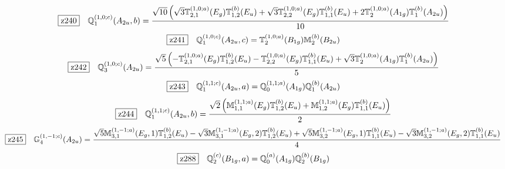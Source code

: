 \documentclass[fleqn,10pt,landscape]{jsarticle}
\begin{document}
\begin{dmath*}
\hspace*{3mm}\fbox{z240}\quad \mathbb{Q}_{1}^{(1,0;c)}(A_{2u},b)=\frac{\sqrt{10} \left(\sqrt{3} \mathbb{T}_{2,1}^{(1,0;a)}(E_{g}) \mathbb{T}_{1,2}^{(b)}(E_{u}) + \sqrt{3} \mathbb{T}_{2,2}^{(1,0;a)}(E_{g}) \mathbb{T}_{1,1}^{(b)}(E_{u}) + 2 \mathbb{T}_{2}^{(1,0;a)}(A_{1g}) \mathbb{T}_{1}^{(b)}(A_{2u})\right)}{10}
\end{dmath*}
\begin{dmath*}
\hspace*{3mm}\fbox{z241}\quad \mathbb{Q}_{1}^{(1,0;c)}(A_{2u},c)=\mathbb{T}_{2}^{(1,0;a)}(B_{1g}) \mathbb{M}_{2}^{(b)}(B_{2u})
\end{dmath*}
\begin{dmath*}
\hspace*{3mm}\fbox{z242}\quad \mathbb{Q}_{3}^{(1,0;c)}(A_{2u})=\frac{\sqrt{5} \left(- \mathbb{T}_{2,1}^{(1,0;a)}(E_{g}) \mathbb{T}_{1,2}^{(b)}(E_{u}) - \mathbb{T}_{2,2}^{(1,0;a)}(E_{g}) \mathbb{T}_{1,1}^{(b)}(E_{u}) + \sqrt{3} \mathbb{T}_{2}^{(1,0;a)}(A_{1g}) \mathbb{T}_{1}^{(b)}(A_{2u})\right)}{5}
\end{dmath*}
\begin{dmath*}
\hspace*{3mm}\fbox{z243}\quad \mathbb{Q}_{1}^{(1,1;c)}(A_{2u},a)=\mathbb{Q}_{0}^{(1,1;a)}(A_{1g}) \mathbb{Q}_{1}^{(b)}(A_{2u})
\end{dmath*}
\begin{dmath*}
\hspace*{3mm}\fbox{z244}\quad \mathbb{Q}_{1}^{(1,1;c)}(A_{2u},b)=\frac{\sqrt{2} \left(\mathbb{M}_{1,1}^{(1,1;a)}(E_{g}) \mathbb{T}_{1,2}^{(b)}(E_{u}) + \mathbb{M}_{1,2}^{(1,1;a)}(E_{g}) \mathbb{T}_{1,1}^{(b)}(E_{u})\right)}{2}
\end{dmath*}
\begin{dmath*}
\hspace*{3mm}\fbox{z245}\quad \mathbb{G}_{4}^{(1,-1;c)}(A_{2u})=\frac{\sqrt{5} \mathbb{M}_{3,1}^{(1,-1;a)}(E_{g},1) \mathbb{T}_{1,2}^{(b)}(E_{u}) - \sqrt{3} \mathbb{M}_{3,1}^{(1,-1;a)}(E_{g},2) \mathbb{T}_{1,2}^{(b)}(E_{u}) + \sqrt{5} \mathbb{M}_{3,2}^{(1,-1;a)}(E_{g},1) \mathbb{T}_{1,1}^{(b)}(E_{u}) - \sqrt{3} \mathbb{M}_{3,2}^{(1,-1;a)}(E_{g},2) \mathbb{T}_{1,1}^{(b)}(E_{u})}{4}
\end{dmath*}
\begin{dmath*}
\hspace*{3mm}\fbox{z288}\quad \mathbb{Q}_{2}^{(c)}(B_{1g},a)=\mathbb{Q}_{0}^{(a)}(A_{1g}) \mathbb{Q}_{2}^{(b)}(B_{1g})
\end{dmath*}
\end{document}
